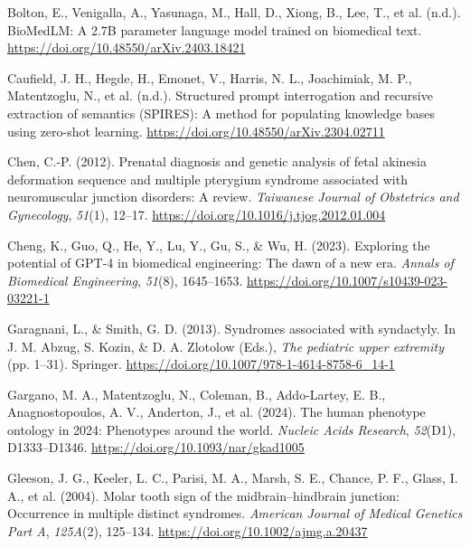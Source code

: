 \documentclass[
]{agujournal2019}
\newlength{\cslhangindent}
\newenvironment{CSLReferences}[2] %
 {\begin{list}{}{%
  \setlength{\itemindent}{0pt}
  \setlength{\leftmargin}{0pt}
  \setlength{\parsep}{0pt}
  \ifodd #1
   \setlength{\leftmargin}{\cslhangindent}
   \setlength{\itemindent}{-1\cslhangindent}
  \fi
  \setlength{\itemsep}{#2\baselineskip}}}
 {\end{list}}
\begin{document}
\label{refs}
\begin{CSLReferences}{1}{0}
\vspace{1em}

Bolton, E., Venigalla, A., Yasunaga, M., Hall, D., Xiong, B., Lee, T.,
et al. (n.d.). BioMedLM: A 2.7B parameter language model trained on
biomedical text. \url{https://doi.org/10.48550/arXiv.2403.18421}

Caufield, J. H., Hegde, H., Emonet, V., Harris, N. L., Joachimiak, M.
P., Matentzoglu, N., et al. (n.d.). Structured prompt interrogation and
recursive extraction of semantics (SPIRES): A method for populating
knowledge bases using zero-shot learning.
\url{https://doi.org/10.48550/arXiv.2304.02711}

Chen, C.-P. (2012). Prenatal diagnosis and genetic analysis of fetal
akinesia deformation sequence and multiple pterygium syndrome associated
with neuromuscular junction disorders: A review. \emph{Taiwanese Journal
of Obstetrics and Gynecology}, \emph{51}(1), 12--17.
\url{https://doi.org/10.1016/j.tjog.2012.01.004}

Cheng, K., Guo, Q., He, Y., Lu, Y., Gu, S., \& Wu, H. (2023). Exploring
the potential of GPT-4 in biomedical engineering: The dawn of a new era.
\emph{Annals of Biomedical Engineering}, \emph{51}(8), 1645--1653.
\url{https://doi.org/10.1007/s10439-023-03221-1}

Garagnani, L., \& Smith, G. D. (2013). Syndromes associated with
syndactyly. In J. M. Abzug, S. Kozin, \& D. A. Zlotolow (Eds.),
\emph{The pediatric upper extremity} (pp. 1--31). Springer.
\url{https://doi.org/10.1007/978-1-4614-8758-6_14-1}

Gargano, M. A., Matentzoglu, N., Coleman, B., Addo-Lartey, E. B.,
Anagnostopoulos, A. V., Anderton, J., et al. (2024). The human phenotype
ontology in 2024: Phenotypes around the world. \emph{Nucleic Acids
Research}, \emph{52}(D1), D1333--D1346.
\url{https://doi.org/10.1093/nar/gkad1005}

Gleeson, J. G., Keeler, L. C., Parisi, M. A., Marsh, S. E., Chance, P.
F., Glass, I. A., et al. (2004). Molar tooth sign of the
midbrain--hindbrain junction: Occurrence in multiple distinct syndromes.
\emph{American Journal of Medical Genetics Part A}, \emph{125A}(2),
125--134. \url{https://doi.org/10.1002/ajmg.a.20437}


\end{CSLReferences}
\end{document}
